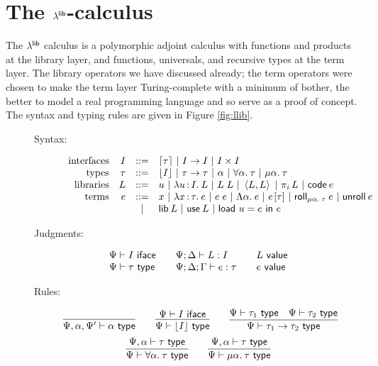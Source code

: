 \documentclass[11pt]{article}
\begin{document}

\section{The $\lambda^{\textsf{lib}}$-calculus}

The $\lambda^{\textsf{lib}}$ calculus is a polymorphic adjoint calculus with functions and
products at the library layer, and functions, universals, and recursive types at
the term layer. The library operators we have discussed already; the term
operators were chosen to make the term layer Turing-complete with a minimum of
bother, the better to model a real programming language and so serve as a proof
of concept. The syntax and typing rules are given in Figure \ref{fig:llib}.

\begin{figure}[p]
  \centering
  \begin{description}
  \item[Syntax:]
    \[\begin{array}{rrcl}
      \text{interfaces} & I &::=& \lceil{\tau}\rceil ~|~ I \to I ~|~ I \times I\\
      \text{types} & \tau &::=&
      \lfloor{I}\rfloor ~|~ \tau \to \tau ~|~ \alpha ~|~ \forall \alpha .\: \tau
      ~|~ \mu \alpha .\: \tau\\
      \text{libraries} & L &::=&
      u ~|~ \lambda u \mathop{:} I .\: L ~|~ L \; L ~|~ \left\langle L,L\right\rangle ~|~ \pi_{i} \, L
      ~|~ \textsf{code}\:{e}\\
      \text{terms} & e &::=&
      x ~|~ \lambda x \mathop{:} \tau .\: e ~|~ e \; e
      ~|~ \Lambda \alpha .\: e ~|~ e\hspace{1pt}[\tau]
      ~|~ \textsf{roll}_{\mu \alpha .\: \tau}\:{e} ~|~ \textsf{unroll}\:{e}\\
      &&~|~& \textsf{lib}\:{L} ~|~ \textsf{use}\:{L} ~|~ \textsf{load}~{u}={e}~\textsf{in}~{e}
    \end{array}\]
  \item[Judgments:]\[
    \begin{array}[]{lll}
      \Psi \ent I \isiface &\quad \Psi;\D \ent L \isa I &\quad L \isval\\
      \Psi \ent \tau \istype &\quad \Psi;\D;\G \ent e \isa \tau &\quad e \isval
    \end{array}\]
  \item[Rules:]
    \[
    \infer{\Psi, \alpha, \Psi' \ent \alpha \istype}{} \qquad
    \infer{\Psi \ent \dn{I} \istype}{\Psi \ent I \isiface} \qquad
    \infer{\Psi \ent \tau_1 \to \tau_2 \istype}{
      \Psi \ent \tau_1 \istype &
      \Psi \ent \tau_2 \istype}
    \]\[
    \infer{\Psi \ent \fa{\alpha}{\tau} \istype}{
      \Psi,\alpha \ent \tau \istype} \qquad
    \infer{\Psi \ent \trec{\alpha}{\tau} \istype}{
      \Psi,\alpha \ent \tau \istype}
    \]


\end{description}
\end{figure}
\end{document}

